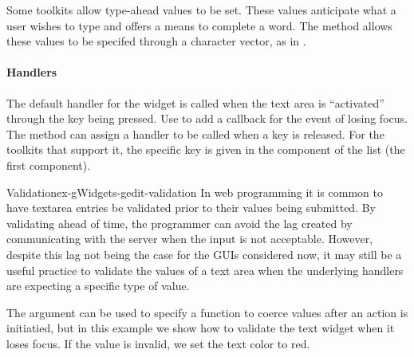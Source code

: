 Some toolkits allow type-ahead values to be set. These values
anticipate what a user wishes to type and offers a means to complete a
word. The \method{[\ASSIGN}{gedit} method allows these values to be
specifed through a character vector, as in .



\paragraph{Handlers}
The default handler for the  widget is called when
the text area is ``activated'' through the
 key being pressed. Use  to add a
callback for the event of losing focus. The
 method can assign a handler to be
called when a key is released. For the toolkits that support it, the
specific key is given in the  component of the list  (the first component).

\begin{example}{Validation}{ex-gWidgets-gedit-validation}
In web programming it is common to have textarea entries be validated
prior to their values being submitted. By validating ahead of time,
the programmer can avoid the lag created by communicating with the
server when the input is not acceptable. However, despite
this lag not being the case for the GUIs considered now, it may still be a
useful practice to validate the values of a text area when the
underlying handlers are expecting a specific type of value.
  
The  argument can be used to specify a function
to coerce values after an action is initiatied, but in this example we
show how to validate the text widget when it loses focus. If the value
is invalid, we set the text color to red.


\begin{Schunk}
\end{Schunk}
\end{example}

